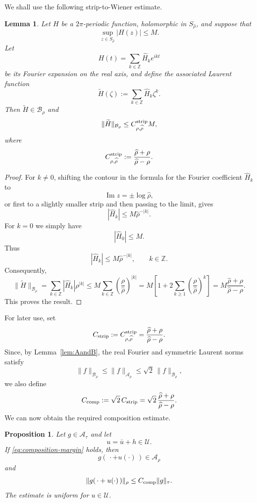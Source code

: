 \documentclass[11pt,a4paper]{amsart}
\newtheorem{lemma}[theorem]{Lemma}
\newtheorem{proposition}[theorem]{Proposition}
\begin{document}
We shall use the following strip-to-Wiener estimate.
\begin{lemma}\label{lem:strip-to-wiener}
	Let $H$ be a $2\pi$-periodic function, holomorphic in
	$S_{\widehat\rho}$, and suppose that
	\[
	\sup_{z\in S_{\widehat\rho}}|H(z)|\le M.
	\]
	Let
	\[
	H(t)=\sum_{k\in\mathbb Z}\widehat H_k e^{ikt}
	\]
	be its Fourier expansion on the real axis, and define the associated
	Laurent function
	\[
	\widetilde H(\zeta)
	:=
	\sum_{k\in\mathbb Z}\widehat H_k\zeta^k.
	\]
	Then $\widetilde H\in\mathcal B_\rho$ and
	\begin{equation}\label{eq:strip-to-wiener}
		\|\widetilde H\|_{\mathcal B_\rho}
		\le
		C_{\rho,\widehat\rho}^{\rm strip}M,
	\end{equation}
	where
	\begin{equation}\label{eq:Cstrip}
		C_{\rho,\widehat\rho}^{\rm strip}
		:=
		\frac{\widehat\rho+\rho}
		{\widehat\rho-\rho}.
	\end{equation}
\end{lemma}

\begin{proof}
	For $k\ne0$, shifting the contour in the formula for the Fourier
	coefficient $\widehat H_k$ to
	\[
	\operatorname{Im}z=\pm\log\widehat\rho,
	\]
	or first to a slightly smaller strip and then passing to the limit,
	gives
	\[
	|\widehat H_k|
	\le
	M\widehat\rho^{-|k|}.
	\]
	For $k=0$ we simply have
	\[
	|\widehat H_0|\le M.
	\]
	Thus
	\[
	|\widehat H_k|
	\le
	M\widehat\rho^{-|k|},
	\qquad k\in\mathbb Z.
	\]
	Consequently,
	\[
		\|\widetilde H\|_{\mathcal B_\rho}=
		\sum_{k\in\mathbb Z}|\widehat H_k|\rho^{|k|}\le
		M\sum_{k\in\mathbb Z}\left(\frac{\rho}{\widehat\rho}\right)^{|k|}=
		M\left[1+2\sum_{k\ge1}\left(\frac{\rho}{\widehat\rho}\right)^k\right]=
		M\frac{\widehat\rho+\rho}{\widehat\rho-\rho}.
	\]
	This proves the result.
\end{proof}
For later use, set
\[
C_{\rm strip}
:=
C_{\rho,\widehat\rho}^{\rm strip}
=
\frac{\widehat\rho+\rho}
{\widehat\rho-\rho}.
\]
Since, by Lemma~\ref{lem:AandB}, the real Fourier and symmetric
Laurent norms satisfy
\[
\|f\|_{\mathcal B_\rho}
\le
\|f\|_{\mathcal A_\rho}
\le
\sqrt2\,\|f\|_{\mathcal B_\rho},
\]
we also define
\begin{equation}\label{eq:Ccomp}
	C_{\rm comp}
	:=
	\sqrt2\,C_{\rm strip}
	=
	\sqrt2\,
	\frac{\widehat\rho+\rho}
	{\widehat\rho-\rho}.
\end{equation}
We can now obtain the required composition estimate.

\begin{proposition}\label{prop:composition-strip}
	Let $g\in\mathcal A_\tau$ and let
	\[
	u=\bar u+h\in\mathcal U.
	\]
	If \eqref{eq:composition-margin} holds, then
	\[
	g(\,\cdot+u(\cdot)\,)\in\mathcal A_\rho
	\]
	and
	\begin{equation}\label{eq:composition-strip}
		\|g(\,\cdot+u(\cdot)\,)\|_\rho
		\le
		C_{\rm comp}\|g\|_\tau.
	\end{equation}
	The estimate is uniform for $u\in\mathcal U$.
\end{proposition}
\end{document}
